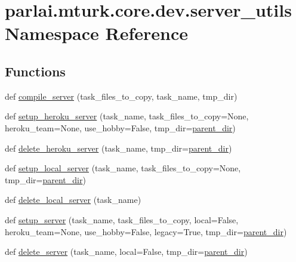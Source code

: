 \hypertarget{namespaceparlai_1_1mturk_1_1core_1_1dev_1_1server__utils}{}\section{parlai.\+mturk.\+core.\+dev.\+server\+\_\+utils Namespace Reference}
\label{namespaceparlai_1_1mturk_1_1core_1_1dev_1_1server__utils}
\subsection*{Functions}
\begin{DoxyCompactItemize}
\item 
def \hyperlink{namespaceparlai_1_1mturk_1_1core_1_1dev_1_1server__utils_ab2ee72bd56197de749229032b05254da}{compile\+\_\+server} (task\+\_\+files\+\_\+to\+\_\+copy, task\+\_\+name, tmp\+\_\+dir)
\item 
def \hyperlink{namespaceparlai_1_1mturk_1_1core_1_1dev_1_1server__utils_a138743e96f495bce1535782ffa0f38bf}{setup\+\_\+heroku\+\_\+server} (task\+\_\+name, task\+\_\+files\+\_\+to\+\_\+copy=None, heroku\+\_\+team=None, use\+\_\+hobby=False, tmp\+\_\+dir=\hyperlink{namespaceparlai_1_1mturk_1_1core_1_1dev_1_1server__utils_a432ae14c0d872fbfebe4d9b7d73d13b9}{parent\+\_\+dir})
\item 
def \hyperlink{namespaceparlai_1_1mturk_1_1core_1_1dev_1_1server__utils_a876e990f1f5e670ff9c89869bdd1f1f6}{delete\+\_\+heroku\+\_\+server} (task\+\_\+name, tmp\+\_\+dir=\hyperlink{namespaceparlai_1_1mturk_1_1core_1_1dev_1_1server__utils_a432ae14c0d872fbfebe4d9b7d73d13b9}{parent\+\_\+dir})
\item 
def \hyperlink{namespaceparlai_1_1mturk_1_1core_1_1dev_1_1server__utils_a914cced79fceeef08836d69d91e2d683}{setup\+\_\+local\+\_\+server} (task\+\_\+name, task\+\_\+files\+\_\+to\+\_\+copy=None, tmp\+\_\+dir=\hyperlink{namespaceparlai_1_1mturk_1_1core_1_1dev_1_1server__utils_a432ae14c0d872fbfebe4d9b7d73d13b9}{parent\+\_\+dir})
\item 
def \hyperlink{namespaceparlai_1_1mturk_1_1core_1_1dev_1_1server__utils_aa5556bd5a5a417d78b4142e697e9a6be}{delete\+\_\+local\+\_\+server} (task\+\_\+name)
\item 
def \hyperlink{namespaceparlai_1_1mturk_1_1core_1_1dev_1_1server__utils_a13d7101c43eceb479444919d4e5f49fe}{setup\+\_\+server} (task\+\_\+name, task\+\_\+files\+\_\+to\+\_\+copy, local=False, heroku\+\_\+team=None, use\+\_\+hobby=False, legacy=True, tmp\+\_\+dir=\hyperlink{namespaceparlai_1_1mturk_1_1core_1_1dev_1_1server__utils_a432ae14c0d872fbfebe4d9b7d73d13b9}{parent\+\_\+dir})
\item 
def \hyperlink{namespaceparlai_1_1mturk_1_1core_1_1dev_1_1server__utils_a3e5b4105c54a289108a8a240aa9b9043}{delete\+\_\+server} (task\+\_\+name, local=False, tmp\+\_\+dir=\hyperlink{namespaceparlai_1_1mturk_1_1core_1_1dev_1_1server__utils_a432ae14c0d872fbfebe4d9b7d73d13b9}{parent\+\_\+dir})
\end{DoxyCompactItemize}
